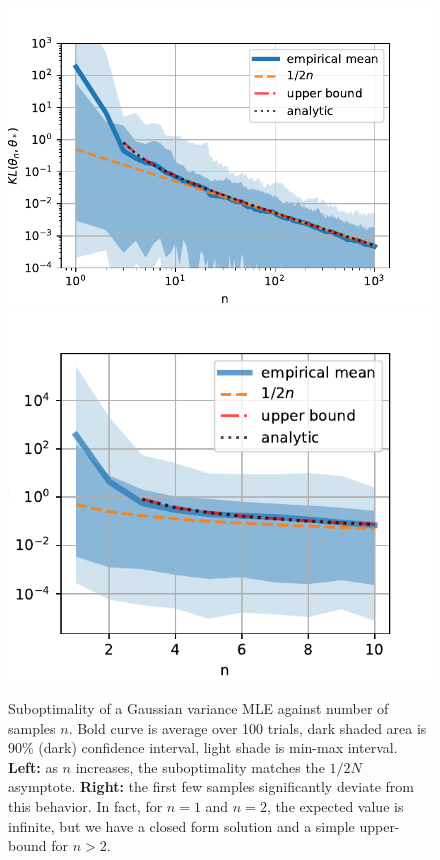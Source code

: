 \documentclass{article}
\begin{document}
\begin{figure}[ht]
	\centering
	\includegraphics[width=.54\textwidth]{figs/asymptote.pdf}
	\includegraphics[width=.43\textwidth]{figs/fewsamples.pdf}
	\caption{Suboptimality of a Gaussian variance MLE against number of samples $n$. Bold curve is average over 100 trials,  dark shaded area is 90\% (dark) confidence interval, light shade is min-max interval.  
	\textbf{Left:} as $n$ increases, the suboptimality matches the $1/2N$ asymptote.
	\textbf{Right:} the first few samples significantly deviate from this behavior. In fact, for $n=1$ and $n=2$, the expected value is infinite, but we have a closed form solution and a simple upper-bound for $n>2$.
	}
	\label{fig:curves}
\end{figure}
\end{document}
